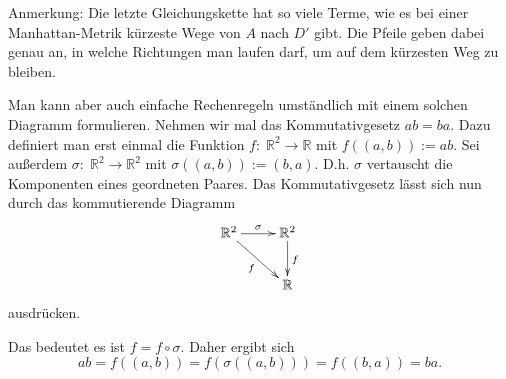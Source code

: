\documentclass[a4paper,12pt,fleqn]{article}
\begin{document}
Anmerkung: Die letzte Gleichungskette hat so viele Terme,
wie es bei einer Manhattan-Metrik kürzeste
Wege von $A$ nach $D'$ gibt. Die Pfeile
geben dabei genau an, in welche Richtungen
man laufen darf, um auf dem kürzesten Weg
zu bleiben.

Man kann aber auch einfache Rechenregeln umständlich
mit einem solchen Diagramm formulieren. Nehmen wir mal
das Kommutativgesetz $ab=ba$. Dazu definiert man erst einmal
die Funktion $f{:}\;\mathbb R^2\rightarrow\mathbb R$ mit
$f((a,b)):=ab$. Sei außerdem
$\sigma{:}\;\mathbb R^2\rightarrow\mathbb R^2$
mit $\sigma((a,b)):=(b,a)$. D.h. $\sigma$ vertauscht die
Komponenten eines geordneten Paares. Das Kommutativgesetz lässt sich
nun durch das kommutierende Diagramm
\[\xymatrix{\mathbb R^2 \ar[r]^\sigma \ar[dr]_f &\ar[d]^f \mathbb R^2\\
& \mathbb R}\]
ausdrücken.

Das bedeutet es ist $f=f\circ\sigma$. Daher ergibt sich
\[ab = f((a,b))=f(\sigma((a,b))) = f((b,a)) = ba.\]
\end{document}
